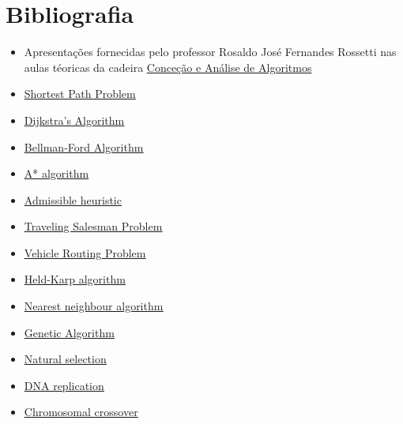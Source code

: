\documentclass[article, a4paper, 12pt, oneside]{memoir}
\begin{document}
\newpage
\chapter{Bibliografia}
\begin{itemize}
	\item Apresentações fornecidas pelo professor Rosaldo José Fernandes Rossetti nas aulas téoricas da cadeira \href{https://sigarra.up.pt/feup/pt/ucurr_geral.ficha_uc_view?pv_ocorrencia_id=436441}{Conceção e Análise de Algoritmos}
	\item \color{blue} \underline{\href{https://en.wikipedia.org/wiki/Shortest_path_problem}{Shortest Path Problem}} \color{black}
	\item \color{blue} \underline{\href{https://en.wikipedia.org/wiki/Dijkstra\%27s_algorithm}{Dijkstra's Algorithm}} \color{black}
	\item \color{blue} \underline{\href{https://en.wikipedia.org/wiki/Bellman\%E2\%80\%93Ford_algorithm}{Bellman-Ford Algorithm}} \color{black}
	\item \color{blue} \underline{\href{https://en.wikipedia.org/wiki/A*_search_algorithm}{A* algorithm}} \color{black}
	\item \color{blue} \underline{\href{https://en.wikipedia.org/wiki/Admissible_heuristic}{Admissible heuristic}} \color{black}
	\item \color{blue} \underline{\href{https://en.wikipedia.org/wiki/Travelling_salesman_problem}{Traveling Salesman Problem}} \color{black}
	\item \color{blue} \underline{\href{https://en.wikipedia.org/wiki/Vehicle_routing_problem}{Vehicle Routing Problem}} \color{black}
	\item \color{blue} \underline{\href{https://en.wikipedia.org/wiki/Held\%E2\%80\%93Karp_algorithm}{Held-Karp algorithm}} \color{black}
	\item \color{blue} \underline{\href{https://en.wikipedia.org/wiki/Nearest_neighbour_algorithm}{Nearest neighbour algorithm}} \color{black}
	\item \color{blue} \underline{\href{https://en.wikipedia.org/wiki/Genetic_algorithm}{Genetic Algorithm}} \color{black}
	\item \color{blue} \underline{\href{https://en.wikipedia.org/wiki/Natural_selection}{Natural selection}} \color{black}
	\item \color{blue} \underline{\href{https://en.wikipedia.org/wiki/DNA_replication}{DNA replication}} \color{black}
	\item \color{blue} \underline{\href{https://en.wikipedia.org/wiki/Chromosomal_crossover}{Chromosomal crossover}} \color{black}

\end{itemize}
\end{document}
